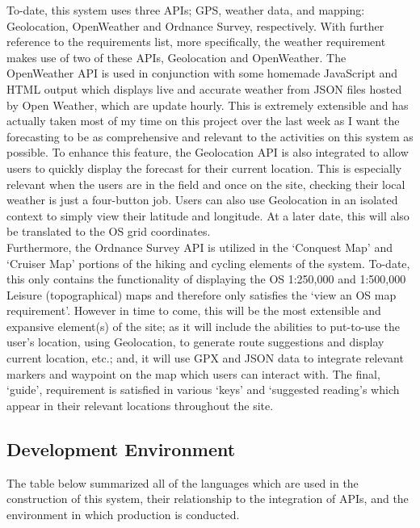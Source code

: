 \documentclass[11pt, english]{article}
\begin{document}
	To-date, this system uses three APIs; GPS, weather data, and mapping: Geolocation, OpenWeather and Ordnance Survey, respectively. With further reference to the requirements list, more specifically, the weather requirement makes use of two of these APIs, Geolocation and OpenWeather. The OpenWeather API is used in conjunction with some homemade JavaScript and HTML output which displays live and accurate weather from JSON files hosted by Open Weather, which are update hourly. This is extremely extensible and has actually taken most of my time on this project over the last week as I want the forecasting to be as comprehensive and relevant to the activities on this system as possible. To enhance this feature, the Geolocation API is also integrated to allow users to quickly display the forecast for their current location. This is especially relevant when the users are in the field and once on the site, checking their local weather is just a four-button job. Users can also use Geolocation in an isolated context to simply view their latitude and longitude. At a later date, this will also be translated to the OS grid coordinates.\\

	Furthermore, the Ordnance Survey API is utilized in the `Conquest Map' and `Cruiser Map' portions of the hiking and cycling elements of the system. To-date, this only contains the functionality of displaying the OS 1:250,000 and 1:500,000 Leisure (topographical) maps and therefore only satisfies the `view an OS map requirement'. However in time to come, this will be the most extensible and expansive element(s) of the site; as it will include the abilities to put-to-use the user's location, using Geolocation, to generate route suggestions and display current location, etc.; and, it will use GPX and JSON data to integrate relevant markers and waypoint on the map which users can interact with. The final, `guide', requirement is satisfied in various `keys' and `suggested reading's which appear in their relevant locations throughout the site.

	\subsection{Development Environment}

	The table below summarized all of the languages which are used in the construction of this system, their relationship to the integration of APIs, and the environment in which production is conducted.
\end{document}

